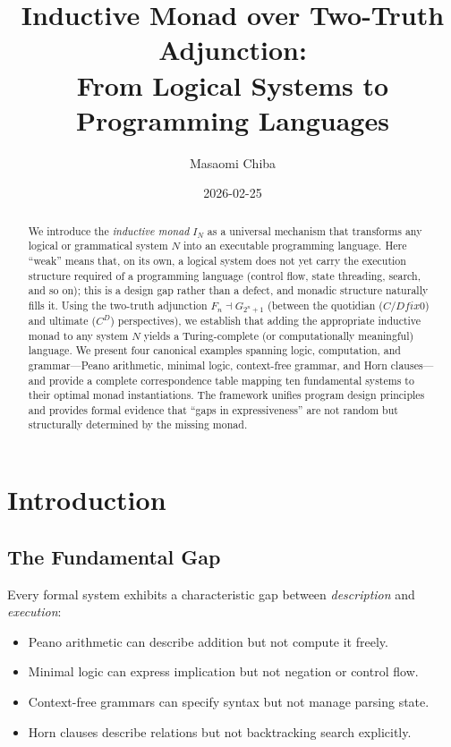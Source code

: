 \documentclass[a4paper,11pt]{article}
\title{Inductive Monad over Two-Truth Adjunction: \\
From Logical Systems to Programming Languages}
\author{Masaomi Chiba}
\date{2026-02-25}
\theoremstyle{definition}
\begin{document}
\maketitle

\begin{abstract}
We introduce the \emph{inductive monad} $I_N$ as a universal mechanism that transforms any logical or grammatical system $N$ into an executable programming language. Here ``weak'' means that, on its own, a logical system does not yet carry the execution structure required of a programming language (control flow, state threading, search, and so on); this is a design gap rather than a defect, and monadic structure naturally fills it. Using the two-truth adjunction $F_n \dashv G_{2^n+1}$ (between the quotidian ($C/Dfix0$) and ultimate ($C^D$) perspectives), we establish that adding the appropriate inductive monad to any system $N$ yields a Turing-complete (or computationally meaningful) language. We present four canonical examples spanning logic, computation, and grammar—Peano arithmetic, minimal logic, context-free grammar, and Horn clauses—and provide a complete correspondence table mapping ten fundamental systems to their optimal monad instantiations. The framework unifies program design principles and provides formal evidence that ``gaps in expressiveness'' are not random but structurally determined by the missing monad.
\end{abstract}

\section{Introduction}

\subsection{The Fundamental Gap}

Every formal system exhibits a characteristic gap between \emph{description} and \emph{execution}:

\begin{itemize}
  \item Peano arithmetic can describe addition but not compute it freely.
  \item Minimal logic can express implication but not negation or control flow.
  \item Context-free grammars can specify syntax but not manage parsing state.
  \item Horn clauses describe relations but not backtracking search explicitly.
\end{itemize}
\end{document}
